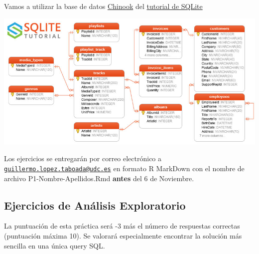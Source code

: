 \documentclass[]{book}
\begin{document}
Vamos a utilizar la base de datos \href{https://www.sqlitetutorial.net/wp-content/uploads/2018/03/chinook.zip}{Chinook} del \href{https://www.sqlitetutorial.net/sqlite-sample-database/}{tutorial de SQLite}

\includegraphics[width=6.25in,height=\textheight]{images/sqlite-sample-database-color.jpg}

Los ejercicios se entregarán por correo electrónico a \href{mailto:guillermo.lopez.taboada@udc.es}{\nolinkurl{guillermo.lopez.taboada@udc.es}} en formato R MarkDown con el nombre de archivo P1-Nombre-Apellidos.Rmd \textbf{antes} del 6 de Noviembre.

\hypertarget{ejercicios-de-analisis-exploratorio}{%
\subsection{Ejercicios de Análisis Exploratorio}\label{ejercicios-de-analisis-exploratorio}}

La puntuación de esta práctica será -3 más el número de respuestas correctas (puntuación máxima 10). Se valorará especialmente encontrar la solución más sencilla en una única query SQL.
\end{document}
